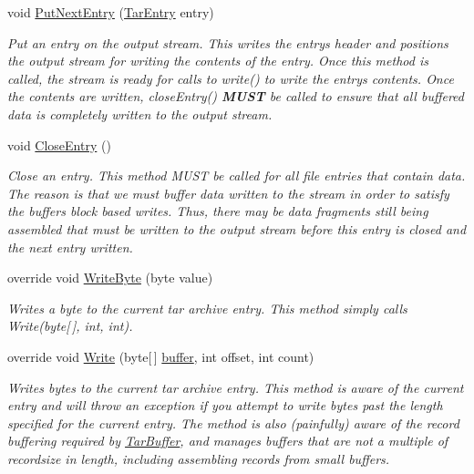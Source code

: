 \begin{DoxyCompactItemize}
void \hyperlink{class_i_c_sharp_code_1_1_sharp_zip_lib_1_1_tar_1_1_tar_output_stream_a0d0a70f8fb770a0be04b69944170c2db}{Put\+Next\+Entry} (\hyperlink{class_i_c_sharp_code_1_1_sharp_zip_lib_1_1_tar_1_1_tar_entry}{Tar\+Entry} entry)
\begin{DoxyCompactList}\small\item\em Put an entry on the output stream. This writes the entry\textquotesingle{}s header and positions the output stream for writing the contents of the entry. Once this method is called, the stream is ready for calls to write() to write the entry\textquotesingle{}s contents. Once the contents are written, close\+Entry() {\bfseries M\+U\+ST} be called to ensure that all buffered data is completely written to the output stream. \end{DoxyCompactList}\item 
void \hyperlink{class_i_c_sharp_code_1_1_sharp_zip_lib_1_1_tar_1_1_tar_output_stream_a655ddc3a9e0219c85e900de5deb0cf74}{Close\+Entry} ()
\begin{DoxyCompactList}\small\item\em Close an entry. This method M\+U\+ST be called for all file entries that contain data. The reason is that we must buffer data written to the stream in order to satisfy the buffer\textquotesingle{}s block based writes. Thus, there may be data fragments still being assembled that must be written to the output stream before this entry is closed and the next entry written. \end{DoxyCompactList}\item 
override void \hyperlink{class_i_c_sharp_code_1_1_sharp_zip_lib_1_1_tar_1_1_tar_output_stream_a86a5cb90ae7900e926e78a299cf53893}{Write\+Byte} (byte value)
\begin{DoxyCompactList}\small\item\em Writes a byte to the current tar archive entry. This method simply calls Write(byte\mbox{[}$\,$\mbox{]}, int, int). \end{DoxyCompactList}\item 
override void \hyperlink{class_i_c_sharp_code_1_1_sharp_zip_lib_1_1_tar_1_1_tar_output_stream_a6b0099fc6688112932356222e4aa16c9}{Write} (byte\mbox{[}$\,$\mbox{]} \hyperlink{class_i_c_sharp_code_1_1_sharp_zip_lib_1_1_tar_1_1_tar_output_stream_a5c3ade1fecb25c00a1e17af46cac1e0b}{buffer}, int offset, int count)
\begin{DoxyCompactList}\small\item\em Writes bytes to the current tar archive entry. This method is aware of the current entry and will throw an exception if you attempt to write bytes past the length specified for the current entry. The method is also (painfully) aware of the record buffering required by \hyperlink{class_i_c_sharp_code_1_1_sharp_zip_lib_1_1_tar_1_1_tar_buffer}{Tar\+Buffer}, and manages buffers that are not a multiple of recordsize in length, including assembling records from small buffers. \end{DoxyCompactList}\end{DoxyCompactItemize}
